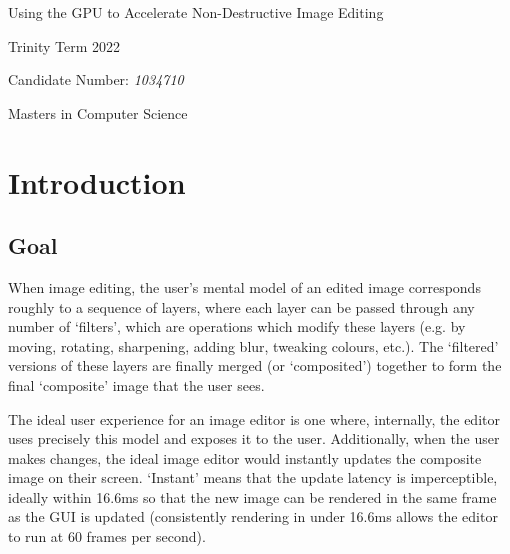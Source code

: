 \documentclass[12pt]{article}
\begin{document}
\begin{titlepage}
    \begin{center}
        \vspace*{1.5in}

        \Huge
        Using the GPU to Accelerate Non-Destructive Image Editing

        \vspace*{2in}

        \Large

        Trinity Term 2022

        \vspace*{0.25in}
        Candidate Number: \emph{1034710}

        \vspace*{0.25in}
        Masters in Computer Science
    \end{center}
\end{titlepage}



\pagebreak

\tableofcontents



\doublespacing

\pagebreak

\section{Introduction}

\subsection{Goal}

When image editing, the user's mental model of an edited image corresponds roughly to a sequence of
layers, where each layer can be passed through any number of `filters', which are operations which
modify these layers (e.g. by moving, rotating, sharpening, adding blur, tweaking colours, etc.).
The `filtered' versions of these layers are finally merged (or `composited') together to form the
final `composite' image that the user sees.

The ideal user experience for an image editor is one where, internally, the editor uses precisely
this model and exposes it to the user.  Additionally, when the user makes changes, the ideal image
editor would instantly updates the composite image on their screen.  `Instant' means that the update
latency is imperceptible, ideally within 16.6ms so that the new image can be rendered in the same
frame as the GUI is updated (consistently rendering in under 16.6ms allows the editor to run at 60
frames per second).
\end{document}
